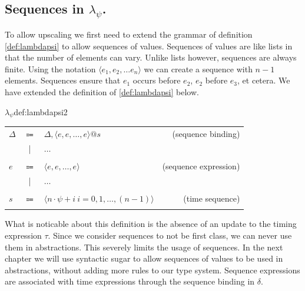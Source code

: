 \subsection{Sequences in $\lambda_\psi$.}
To allow upscaling we first need to extend the grammar of definition \ref{def:lambdapsi} to allow sequences of values.
Sequences of values are like lists in that the number of elements can vary.
Unlike lists however, sequences are always finite.
Using the notation $\langle e_1, e_2, \ldots e_n \rangle$ we can create a sequence with $n-1$ elements.
Sequences ensure that $e_1$ occurs before $e_2$, $e_2$ before $e_3$, et cetera.
We have extended the definition of \ref{def:lambdapsi} below.

\begin{definitiontitled}{$\lambda_\psi$}{def:lambdapsi2}
\begin{tabular}{lclr}
$\Delta$& $\Coloneqq$ & $\Delta,\langle e, e, \ldots, e \rangle @s$ & (sequence binding) \\
          & |         & $\ldots$ \\
\\
$e$     & $\Coloneqq$ &  $\langle e, e, \ldots, e \rangle$ & (sequence expression) \\
        & |           &  $\ldots$ \\
\\
$s$     & $\Coloneqq$ & $\langle n \cdot \psi + i \: i = 0,1,\ldots,(n-1) \rangle$ & (time sequence)\\
\\
\end{tabular}
\end{definitiontitled}

What is noticable about this definition is the absence of an update to the timing expression $\tau$.
Since we consider sequences to not be first class, we can never use them in abstractions.
This severely limits the usage of sequences.
In the next chapter we will use syntactic sugar to allow sequences of values to be used in abstractions, without adding more rules to our type system.
Sequence expressions are associated with time expressions through the sequence binding in $\delta$.


